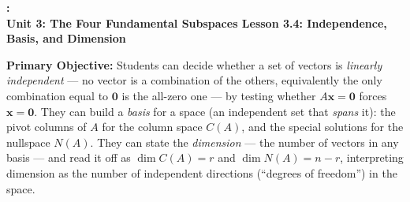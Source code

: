 \documentclass[10pt]{article}
\newcommand{\xx}{\mathbf{x}}
\newcommand{\zero}{\mathbf{0}}
\newcommand{\UnitNumberName}{Unit 3: The Four Fundamental Subspaces \quad}
\newcommand{\LessonNumberName}{Lesson 3.4: Independence, Basis, and Dimension}
\begin{document}
\begin{center}
    {\Large\bfseries \CourseName: \SchoolYear \\
    {\small\bfseries \UnitNumberName \LessonNumberName}}
\end{center}

\begin{tcolorbox}[colback=blush, colframe=burgundy, boxrule=0.9pt, arc=2mm,
    left=2mm, right=2mm, top=1.5mm, bottom=1.5mm]
    \textbf{Primary Objective:} Students can decide whether a set of vectors is \emph{linearly
    independent} --- no vector is a combination of the others, equivalently the only combination equal to
    $\zero$ is the all-zero one --- by testing whether $A\xx=\zero$ forces $\xx=\zero$. They can build a
    \emph{basis} for a space (an independent set that \emph{spans} it): the pivot columns of $A$ for the
    column space $C(A)$, and the special solutions for the nullspace $N(A)$. They can state the
    \emph{dimension} --- the number of vectors in any basis --- and read it off as $\dim C(A)=r$ and
    $\dim N(A)=n-r$, interpreting dimension as the number of independent directions (``degrees of
    freedom'') in the space.
\end{tcolorbox}
\end{document}
